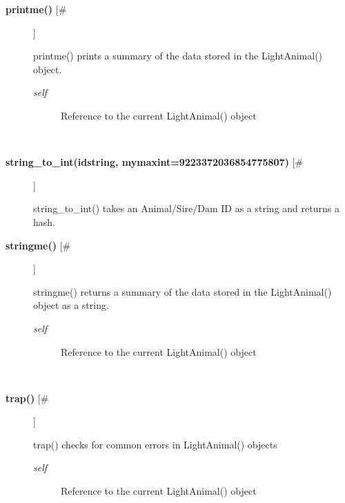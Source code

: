 \documentclass{article}
\begin{document}
\begin{description}
\item[\textbf{printme()} [\#]
]
\par printme() prints a summary of the data stored in the LightAnimal() object.
\begin{description}
\item[\textit{self}
]
Reference to the current LightAnimal() object
\end{description}\\

\item[\textbf{string\_to\_int(idstring, mymaxint=9223372036854775807)} [\#]
]
\par string\_to\_int() takes an Animal/Sire/Dam ID as a string and returns a
hash.

\item[\textbf{stringme()} [\#]
]
\par stringme() returns a summary of the data stored in the LightAnimal() object
as a string.
\begin{description}
\item[\textit{self}
]
Reference to the current LightAnimal() object
\end{description}\\

\item[\textbf{trap()} [\#]
]
\par trap() checks for common errors in LightAnimal() objects
\begin{description}
\item[\textit{self}
]
Reference to the current LightAnimal() object
\end{description}\\

\end{description}
\end{document}
